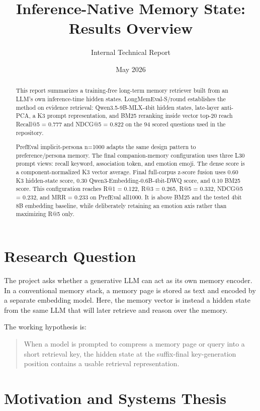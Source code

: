 \documentclass[11pt]{article}
\title{Inference-Native Memory State: Results Overview}
\author{Internal Technical Report}
\date{May 2026}
\begin{document}
\maketitle

\begin{abstract}
This report summarizes a training-free long-term memory retriever built from an
LLM's own inference-time hidden states. LongMemEval-S/round establishes the
method on evidence retrieval: Qwen3.5-9B-MLX-4bit hidden states, late-layer
anti-PCA, a K3 prompt representation, and BM25 reranking inside vector top-20
reach Recall@5 = 0.777 and NDCG@5 = 0.822 on the 94 scored questions used in
the repository.

PrefEval implicit-persona n=1000 adapts the same design pattern to
preference/persona memory. The final companion-memory configuration uses three
L30 prompt views: recall keyword, association token, and emotion emoji. The
dense score is a component-normalized K3 vector average. Final full-corpus
z-score fusion uses 0.60 K3 hidden-state score, 0.30
Qwen3-Embedding-0.6B-4bit-DWQ score, and 0.10 BM25 score. This configuration
reaches R@1 = 0.122, R@3 = 0.265, R@5 = 0.332, NDCG@5 = 0.232, and MRR =
0.233 on PrefEval all1000. It is above BM25 and the tested 4bit 8B embedding
baseline, while deliberately retaining an emotion axis rather than maximizing
R@5 only.
\end{abstract}

\section{Research Question}

The project asks whether a generative LLM can act as its own memory encoder. In
a conventional memory stack, a memory page is stored as text and encoded by a
separate embedding model. Here, the memory vector is instead a hidden state
from the same LLM that will later retrieve and reason over the memory.

The working hypothesis is:

\begin{quote}
When a model is prompted to compress a memory page or query into a short
retrieval key, the hidden state at the suffix-final key-generation position
contains a usable retrieval representation.
\end{quote}

\section{Motivation and Systems Thesis}
\end{document}
